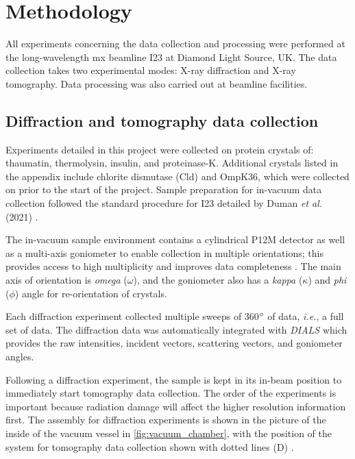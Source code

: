 \newpage
\section{Methodology}\label{sec:methodology}

All experiments concerning the data collection and processing were performed at the long-wavelength \ac{mx} beamline I23 at Diamond Light Source, UK. The data collection takes two experimental modes: X-ray diffraction and X-ray tomography. Data processing was also carried out at beamline facilities. %

\subsection{Diffraction and tomography data collection}

Experiments detailed in this project were collected on protein crystals of: thaumatin, thermolysin, insulin, and proteinase-K. Additional crystals listed in the appendix include chlorite dismutase (Cld) and OmpK36, which were collected on prior to the start of the project.
Sample preparation for in-vacuum data collection followed the standard procedure for I23 detailed by Duman \textit{et al.} (2021) \cite{Duman2021}.

The in-vacuum sample environment contains a cylindrical P12M detector as well as a multi-axis goniometer to enable collection  in multiple orientations; this provides access to high multiplicity and improves data completeness \cite{Finke2016}. The main axis of orientation is \textit{omega} ($\omega$), and the goniometer also has a \textit{kappa} ($\kappa$) and \textit{phi} ($\phi$) angle for re-orientation of crystals. %

Each diffraction experiment collected multiple sweeps of 360$\degree$ of data, \textit{i.e.}, a full set of data. The diffraction data was automatically integrated with \textit{DIALS} \cite{Winter2018} which provides the raw intensities, incident vectors, scattering vectors, and goniometer angles.

Following a diffraction experiment, the sample is kept in its in-beam position to immediately start tomography data collection. The order of the experiments is important because radiation damage will affect the higher resolution information first. The assembly for diffraction experiments is shown in the picture of the inside of the vacuum vessel in \cref{fig:vacuum_chamber}, with the position of the system for tomography data collection
shown with dotted lines (D) \cite{Kazantsev2021}.%

